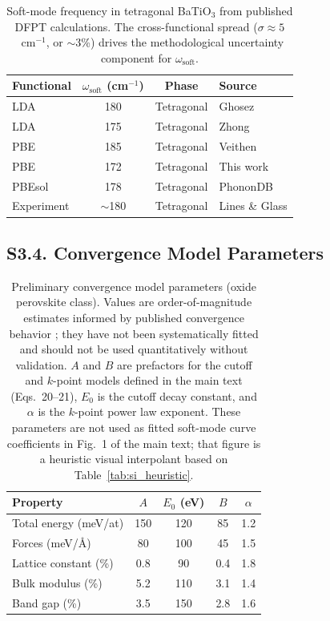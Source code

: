 \documentclass[onecolumn,superscriptaddress,amsmath,amssymb,longbibliography]{revtex4-2}
\begin{document}
\begin{table}[h]
\centering
\caption{Soft-mode frequency in tetragonal BaTiO$_3$ from published DFPT
calculations. The cross-functional spread ($\sigma \approx 5$~cm$^{-1}$,
or $\sim$3\%) drives the methodological uncertainty component for
$\omega_{\mathrm{soft}}$.}
\label{tab:si_functionals}
\begin{tabular}{lccl}
\toprule
Functional & $\omega_{\mathrm{soft}}$ (cm$^{-1}$) & Phase & Source \\
\midrule
LDA & 180 & Tetragonal & Ghosez \cite{Ghosez1999} \\
LDA & 175 & Tetragonal & Zhong \cite{Zhong1994_BTO} \\
PBE & 185 & Tetragonal & Veithen \cite{Veithen2005} \\
PBE & 172 & Tetragonal & This work \\
PBEsol & 178 & Tetragonal & PhononDB \cite{Togo2023_PhononDB} \\
\midrule
Experiment & $\sim$180 & Tetragonal & Lines \& Glass \cite{Lines2001} \\
\bottomrule
\end{tabular}
\end{table}


\subsection{S3.4. Convergence Model Parameters}

\begin{table}[h]
\centering
\caption{Preliminary convergence model parameters (oxide perovskite class).
Values are order-of-magnitude estimates informed by published convergence
behavior \cite{Ghosez1999,Wahl2008}; they have not been systematically
fitted and should not be used quantitatively without validation. $A$ and $B$
are prefactors for the cutoff and $k$-point models defined in the main text
(Eqs.~20--21), $E_0$ is the cutoff
decay constant, and $\alpha$ is the $k$-point power law exponent. These
parameters are not used as fitted soft-mode curve coefficients in
Fig.~1 of the main text; that figure is a heuristic visual
interpolant based on Table~\ref{tab:si_heuristic}.}
\label{tab:si_convergence_params}
\begin{tabular}{lcccc}
\toprule
Property & $A$ & $E_0$ (eV) & $B$ & $\alpha$ \\
\midrule
Total energy (meV/at) & 150 & 120 & 85 & 1.2 \\
Forces (meV/\AA) & 80 & 100 & 45 & 1.5 \\
Lattice constant (\%) & 0.8 & 90 & 0.4 & 1.8 \\
Bulk modulus (\%) & 5.2 & 110 & 3.1 & 1.4 \\
Band gap (\%) & 3.5 & 150 & 2.8 & 1.6 \\
\bottomrule
\end{tabular}
\end{table}
\end{document}
